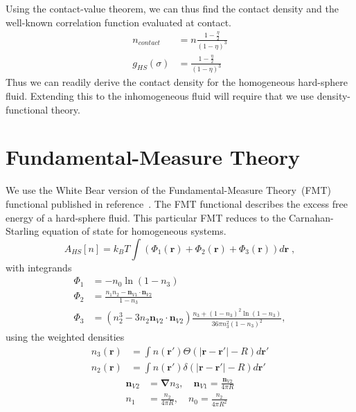 \documentclass[letterpaper,twocolumn,amsmath,amssymb,jcp,10pt,aip]{revtex4-1}
\newcommand{\rr}{\textbf{r}}
\newcommand{\derivation}[1]{} %
\begin{document}
Using the contact-value theorem, we can thus find the contact density
and the well-known correlation function evaluated at contact.
\begin{align}
  n_\textit{contact} &= n \frac{1 - \frac{\eta}2}{(1-\eta)^3} \\
  g_{HS}(\sigma) &= \frac{1 - \frac{\eta}2}{(1-\eta)^3} \label{eq:cs-g}
\end{align}
Thus we can readily derive the contact density for the homogeneous
hard-sphere fluid.  Extending this to the inhomogeneous fluid will
require that we use density-functional theory.

\section{Fundamental-Measure Theory}

We use the White Bear version of the Fundamental-Measure Theory~(FMT)
functional published in reference~\cite{roth2002whitebear}.  The FMT
functional describes the excess free energy of a hard-sphere fluid.
This particular FMT reduces to the Carnahan-Starling equation of state
for homogeneous systems.
\begin{equation}
A_\textit{HS}[n] = k_B T \int \left(\Phi_1(\rr) + \Phi_2(\rr) + \Phi_3(\rr)\right) d\rr \; ,
\end{equation}
with integrands
\begin{align}
\Phi_1 &= -n_0 \ln\left( 1 - n_3\right)\\
\Phi_2 &= \frac{n_1 n_2 - \mathbf{n}_{V1} \cdot\mathbf{n}_{V2}}{1-n_3} \\
\Phi_3 &= (n_2^3 - 3 n_2 \mathbf{n}_{V2} \cdot \mathbf{n}_{V2}) \frac{
  n_3 + (1-n_3)^2 \ln(1-n_3)
}{
  36\pi n_3^2\left( 1 - n_3 \right)^2
} ,
\end{align}
using the weighted densities
\begin{align}
  n_3(\rr) &= \int n(\rr') \Theta(\left|\rr - \rr'\right| - R) d\rr' \\
  n_2(\rr) &= \int n(\rr') \delta(\left|\rr - \rr'\right| - R) d\rr'
\end{align}
\begin{align}
  \mathbf{n}_{V2} &= \mathbf{\nabla} n_3 , \quad
  \mathbf{n}_{V1} = \frac{\mathbf{n}_{V2}}{4\pi R} \\
  n_1 &= \frac{n_2}{4\pi R} , \quad
  n_0 = \frac{n_2}{4\pi R^2}
\end{align}


\derivation{
  \begin{widetext}
}
\end{document}
